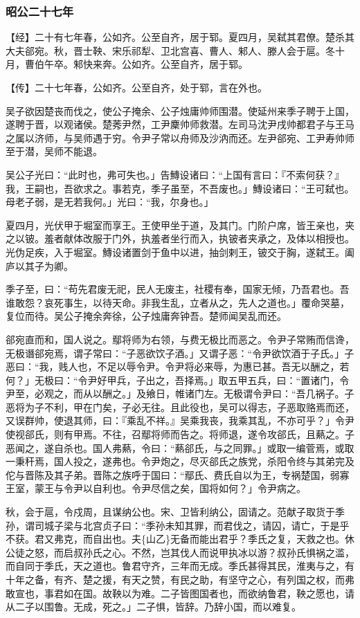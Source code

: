 \documentclass[]{article}
\begin{document}
\hypertarget{header-n2804}{%
\subsubsection{昭公二十七年}\label{header-n2804}}

【经】二十有七年春，公如齐。公至自齐，居于郓。夏四月，吴弑其君僚。楚杀其大夫郤宛。秋，晋士鞅、宋乐祁犁、卫北宫喜、曹人、邾人、滕人会于扈。冬十月，曹伯午卒。邾快来奔。公如齐。公至自齐，居于郓。

【传】二十七年春，公如齐。公至自齐，处于郓，言在外也。

吴子欲因楚丧而伐之，使公子掩余、公子烛庸帅师围潜。使延州来季子聘于上国，遂聘于晋，以观诸侯。楚莠尹然，工尹麇帅师救潜。左司马沈尹戌帅都君子与王马之属以济师，与吴师遇于穷。令尹子常以舟师及沙汭而还。左尹郤宛、工尹寿帅师至于潜，吴师不能退。

吴公子光曰：``此时也，弗可失也。」告鱄设诸曰：``上国有言曰：『不索何获？』我，王嗣也，吾欲求之。事若克，季子虽至，不吾废也。」鱄设诸曰：``王可弑也。母老子弱，是无若我何。」光曰：``我，尔身也。」

夏四月，光伏甲于堀室而享王。王使甲坐于道，及其门。门阶户席，皆王亲也，夹之以铍。羞者献体改服于门外，执羞者坐行而入，执铍者夹承之，及体以相授也。光伪足疾，入于堀室。鱄设诸置剑于鱼中以进，抽剑剌王，铍交于胸，遂弑王。阖庐以其子为卿。

季子至，曰：``苟先君废无祀，民人无废主，社稷有奉，国家无倾，乃吾君也。吾谁敢怨？哀死事生，以待天命。非我生乱，立者从之，先人之道也。」覆命哭墓，复位而待。吴公子掩余奔徐，公子烛庸奔钟吾。楚师闻吴乱而还。

郤宛直而和，国人说之。鄢将师为右领，与费无极比而恶之。令尹子常贿而信谗，无极谮郤宛焉，谓子常曰：``子恶欲饮子酒。」又谓子恶：``令尹欲饮酒于子氏。」子恶曰：``我，贱人也，不足以辱令尹。令尹将必来辱，为惠已甚。吾无以酬之，若何？」无极曰：``令尹好甲兵，子出之，吾择焉。」取五甲五兵，曰：``置诸门，令尹至，必观之，而从以酬之。」及飨日，帷诸门左。无极谓令尹曰：``吾几祸子。子恶将为子不利，甲在门矣，子必无往。且此役也，吴可以得志，子恶取赂焉而还，又误群帅，使退其师，曰：『乘乱不祥。』吴乘我丧，我乘其乱，不亦可乎？」令尹使视郤氏，则有甲焉。不往，召鄢将师而告之。将师退，遂令攻郤氏，且爇之。子恶闻之，遂自杀也。国人弗爇，令曰：``爇郤氏，与之同罪。」或取一编菅焉，或取一秉秆焉，国人投之，遂弗也。令尹炮之，尽灭郤氏之族党，杀阳令终与其弟完及佗与晋陈及其子弟。晋陈之族呼于国曰：``鄢氏、费氏自以为王，专祸楚国，弱寡王室，蒙王与令尹以自利也。令尹尽信之矣，国将如何？」令尹病之。

秋，会于扈，令戍周，且谋纳公也。宋、卫皆利纳公，固请之。范献子取货于季孙，谓司城子梁与北宫贞子曰：``季孙未知其罪，而君伐之，请囚，请亡，于是乎不获。君又弗克，而自出也。夫\{山乙\}无备而能出君乎？季氏之复，天救之也。休公徒之怒，而启叔孙氏之心。不然，岂其伐人而说甲执冰以游？叔孙氏惧祸之滥，而自同于季氏，天之道也。鲁君守齐，三年而无成。季氏甚得其民，淮夷与之，有十年之备，有齐、楚之援，有天之赞，有民之助，有坚守之心，有列国之权，而弗敢宣也，事君如在国。故鞅以为难。二子皆图国者也，而欲纳鲁君，鞅之愿也，请从二子以围鲁。无成，死之。」二子惧，皆辞。乃辞小国，而以难复。
\end{document}
